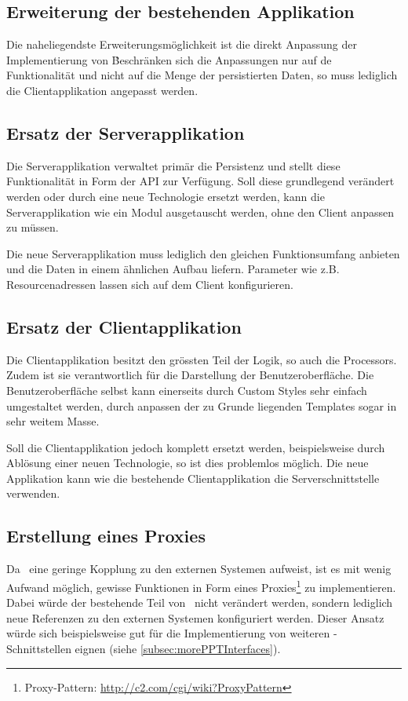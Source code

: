 		\subsection{Erweiterung der bestehenden Applikation}
			Die naheliegendste Erweiterungsmöglichkeit ist die direkt Anpassung der Implementierung von \eeppi\.
			Beschränken sich die Anpassungen nur auf de Funktionalität und nicht auf die Menge der persistierten Daten, so muss lediglich die Clientapplikation angepasst werden.
	
		\subsection{Ersatz der Serverapplikation}
			Die Serverapplikation verwaltet primär die Persistenz und stellt diese Funktionalität in Form der API zur Verfügung.
			Soll diese grundlegend verändert werden oder durch eine neue Technologie ersetzt werden,
			kann die Serverapplikation wie ein Modul ausgetauscht werden, ohne den Client anpassen zu müssen.
			
			Die neue Serverapplikation muss lediglich den gleichen Funktionsumfang anbieten und die Daten in einem ähnlichen Aufbau liefern.
			Parameter wie z.B. Resourcenadressen lassen sich auf dem Client konfigurieren. 
	
		\subsection{Ersatz der Clientapplikation}
			Die Clientapplikation besitzt den grössten Teil der Logik, so auch die Processors.
			Zudem ist sie verantwortlich für die Darstellung der Benutzeroberfläche.
			Die Benutzeroberfläche selbst kann einerseits durch Custom Styles sehr einfach umgestaltet werden, durch anpassen der zu Grunde liegenden Templates sogar in sehr weitem Masse.
			
			Soll die Clientapplikation jedoch komplett ersetzt werden, beispielsweise durch Ablösung einer neuen Technologie, so ist dies problemlos möglich.
			Die neue Applikation kann wie die bestehende Clientapplikation die Serverschnittstelle verwenden.
			

		\subsection{Erstellung eines Proxies}
			Da \eeppi\ eine geringe Kopplung zu den externen Systemen aufweist,
			 ist es mit wenig Aufwand möglich,
			gewisse Funktionen in Form eines Proxies\footnote{Proxy-Pattern: \url{http://c2.com/cgi/wiki?ProxyPattern}} zu implementieren.
			Dabei würde der bestehende Teil von \eeppi\ nicht verändert werden,
			sondern lediglich neue Referenzen zu den externen Systemen konfiguriert werden.
			Dieser Ansatz würde sich beispielsweise gut für die Implementierung von weiteren \ppt-Schnittstellen eignen (siehe \ref{subsec:morePPTInterfaces}).
			
